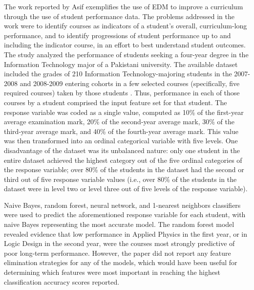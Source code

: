 The work reported by Asif \cite{Asif} exemplifies the use of EDM to improve a curriculum through the use of student performance data.  The problems addressed in the work were to identify courses as indicators of a student's overall, curriculum-long performance, and to identify progressions of student performance up to and including the indicator course, in an effort to best understand student outcomes.  The study analyzed the performance of students seeking a four-year degree in the Information Technology major of a Pakistani university.  The available dataset included the grades of 210 Information Technology-majoring students in the 2007-2008 and 2008-2009 entering cohorts in a few selected courses (specifically, five required courses) taken by those students \cite[Table 1]{Asif}.  Thus, performance in each of those courses by a student comprised the input feature set for that student.  The response variable was coded as a single value, computed as 10\% of the first-year average examination mark, 20\% of the second-year average mark, 30\% of the third-year average mark, and 40\% of the fourth-year average mark.  This value was then transformed into an ordinal categorical variable with five levels.  One disadvantage of the dataset was its unbalanced nature: only one student in the entire dataset achieved the highest category out of the five ordinal categories of the response variable; over 80\% of the students in the dataset had the second or third out of five response variable values (i.e., over 80\% of the students in the dataset were in level two or level three out of five levels of the response variable).  

Naive Bayes, random forest, neural network, and 1-nearest neighbors classifiers were used to predict the aforementioned response variable for each student, with naive Bayes representing the most accurate model.  The random forest model revealed evidence that low performance in Applied Physics in the first year, or in Logic Design in the second year, were the courses most strongly predictive of poor long-term performance.  However, the paper did not report any feature elimination strategies for any of the models, which would have been useful for determining which features were most important in reaching the highest classification accuracy scores reported.  

